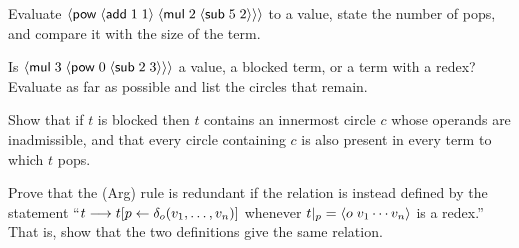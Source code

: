 \begin{exercise}[\dag]\label{ex:ch3-eval}
Evaluate $\langle \mathsf{pow}\; \langle \mathsf{add}\; 1\; 1\rangle\; \langle \mathsf{mul}\; 2\; \langle \mathsf{sub}\; 5\; 2\rangle\rangle\rangle$ to a value, state the number of pops, and compare it with the size of the term.
\end{exercise}

\begin{exercise}[\dag]\label{ex:ch3-blocked}
Is $\langle \mathsf{mul}\; 3\; \langle \mathsf{pow}\; 0\; \langle \mathsf{sub}\; 2\; 3\rangle\rangle\rangle$ a value, a blocked term, or a term with a redex? Evaluate as far as possible and list the circles that remain.
\end{exercise}

\begin{exercise}
Show that if $t$ is blocked then $t$ contains an innermost circle $c$ whose operands are inadmissible, and that every circle containing $c$ is also present in every term to which $t$ pops.
\end{exercise}

\begin{exercise}
Prove that the (Arg) rule is redundant if the relation is instead defined by the statement ``$t\longrightarrow t[p\leftarrow\delta_o(v_1,\dots,v_n)]$ whenever $t|_p=\langle o\;v_1\cdots v_n\rangle$ is a redex.'' That is, show that the two definitions give the same relation.
\end{exercise}
